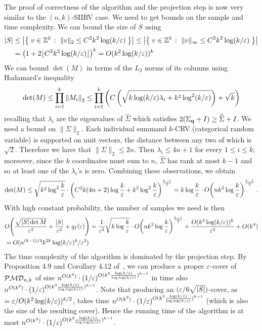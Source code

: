 The proof of correctness of the algorithm and the projection step is now very similar to the $(n,k)$-SIIRV case. We need to get bounds on the sample and time complexity.
We can bound the size of $S$ using
\begin{align*}
|S| & \leq \abs{\setOfSuchThat{ v\in \Z^k }{ \|v\|_2 \leq  C^2 k^2 \log(k/\eps) }} 
\leq \abs{\setOfSuchThat{ v\in \Z^k }{ \|v\|_\infty \leq  C^2 k^2 \log(k/\eps) }} \\
&= \left(1+2\lfloor C^2 k^2 \log(k/\eps)\rfloor \right)^k  
 = O(k^2\log(k/\eps))^k
\end{align*}
We can bound $\det(M)$ in terms of the $L_2$ norms of its columns using Hadamard's inequality
\[
  \det(M) \leq \prod_{i=1}^k \normtwo{M_i} \leq \prod_{i=1}^k \left( C \left(\sqrt{k \log(k/\eps)\lambda_i+k^2\log^2(k/\eps)}\right) + \sqrt{k} \right)
\]
recalling that $\lambda_i$ are the eigenvalues of $\widehat{\Sigma}$ which satisfies $2(\Sigma_\q+I) \geq \widehat{\Sigma}+I$.
 We need a bound on $\|\Sigma\|_2$. Each individual summand $k$-CRV (categorical random variable) is supported on unit vectors, the distance between any two of which is $\sqrt{2}$. Therefore we have that $\|\Sigma\|_2 \leq 2n$. Then $\lambda_i \leq 4n+1$ for every $1\leq i\leq k$; moreover, since the $k$ coordinates must sum to $n$, $\widehat{\Sigma}$ has rank at most $k-1$ and so at least one of the $\lambda_i$'s is zero. Combining these observations, we obtain
\[
    \det(M) \leq \sqrt{k^2\log^2\frac{k}{\eps}}\cdot \left(C^2 k(4n+2) \log\frac{k}{\eps} + k^2\log^2\frac{k}{\eps}\right)^{\frac{k-1}{2}} = k\log\frac{k}{\eps}\cdot \bigO{nk^2 \log\frac{k}{\eps}}^{\frac{k-1}{2}} \; .
\]
With high constant probability, the number of samples we need is then
 \begin{align*}
 & \bigO{ \frac{\sqrt{\abs{S}\det{M}}}{\eps^2} + \frac{\abs{S}}{\eps^2} + q_I(\eps)  } = 
  \frac{1}{\eps^2}\sqrt{k\log\frac{k}{\eps}}\cdot \bigO{nk^2 \log\frac{k}{\eps}}^{\frac{k-1}{4}} + \frac{O(k^2\log(k/\eps))^{k}}{\eps^2} + O(k^4) \\
 &= O(n^{(k-1)/4} k^{2k} \log(k/\eps)^k/\eps^2)
 \end{align*}
 The time complexity of the algorithm is dominated by the projection step. By Proposition 4.9 and Corollary 4.12 of~\cite{DKS:15c}, we can produce a proper
 $\eps$-cover of $\classpmd[n]{k}$ of size $n^{O(k^3)} \cdot (1/\eps)^{O(k^3\frac{\log(k/\eps)}{\log\log(k/\eps)})^{k-1}}$ in time also $n^{O(k^3)} \cdot (1/\eps)^{O(k^3\frac{\log(k/\eps)}{\log\log(k/\eps)})^{k-1}}$. Note that producing an $(\eps/6\sqrt{|S|})$-cover, as $=\eps/O(k^2\log(k/\eps))^{k/2}$, takes time $n^{O(k^3)} \cdot (1/\eps)^{O(k^3\frac{\log(k/\eps)}{\log\log(k/\eps)})^{k-1}}$ (which is also the size of the resulting cover). Hence the running time of the algorithm is at most $n^{O(k^3)} \cdot (1/\eps)^{O(k^3\frac{\log(k/\eps)}{\log\log(k/\eps)})^{k-1}}$.

